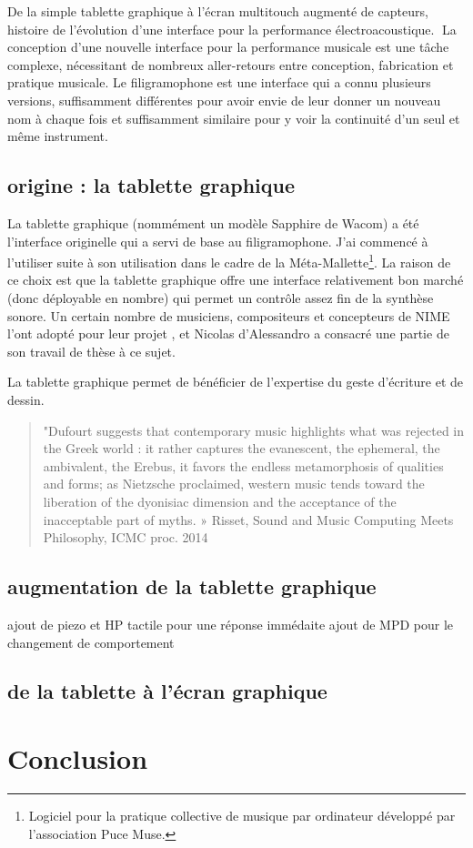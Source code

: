 De la simple tablette graphique à l’écran multitouch augmenté de capteurs, histoire de l’évolution d’une interface pour la performance électroacoustique.
La conception d’une nouvelle interface pour la performance musicale est une tâche complexe, nécessitant de nombreux aller-retours entre conception, fabrication et pratique musicale. Le filigramophone est une interface qui a connu plusieurs versions, suffisamment différentes pour avoir envie de leur donner un nouveau nom à chaque fois et suffisamment similaire pour y voir la continuité d’un seul et même instrument.

\subsection{origine : la tablette graphique}
La tablette graphique (nommément un modèle Sapphire de Wacom) a été l’interface originelle qui a servi de base au filigramophone. J’ai commencé à l’utiliser suite à son utilisation dans le cadre de la Méta-Mallette\footnote{Logiciel pour la pratique collective de musique par ordinateur développé par l’association Puce Muse.}. La raison de ce choix est que la tablette graphique offre une interface relativement bon marché (donc déployable en nombre) qui permet un contrôle assez fin de la synthèse sonore.
Un certain nombre de musiciens, compositeurs et concepteurs de NIME l’ont adopté pour leur projet \cite{Zby07}, et Nicolas d’Alessandro a consacré une partie de son travail de thèse \cite{Ale09} à ce sujet.

La tablette graphique permet de bénéficier de l’expertise du geste d’écriture et de dessin.

\begin{quote}
"Dufourt suggests that contemporary music highlights what was rejected in the Greek world : it rather captures the evanescent, the ephemeral, the ambivalent, the Erebus, it favors the endless metamorphosis of qualities and forms; as Nietzsche proclaimed, western music tends toward the liberation of the dyonisiac dimension and the acceptance of the inacceptable part of myths. » Risset, Sound and Music Computing Meets Philosophy, ICMC proc. 2014
\end{quote}

\subsection{augmentation de la tablette graphique}
ajout de piezo et HP tactile pour une réponse immédaite
ajout de MPD pour le changement de comportement

\subsection{de la tablette à l'écran graphique}


\section{Conclusion}
\label{sec:interfaces:conclusion}
